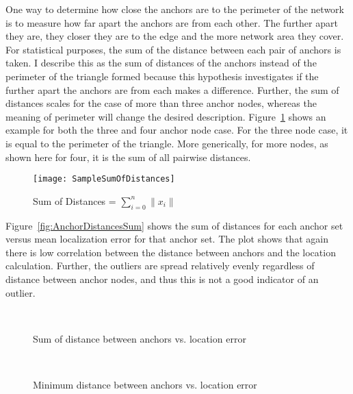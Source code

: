 One way to determine how close the anchors are to the perimeter of the network is to measure how far apart the anchors are from each other.  The further apart they are, they closer they are to the edge and the more network area they cover.  For statistical purposes, the sum of the distance between each pair of anchors is taken.  I describe this as the sum of distances of the anchors instead of the perimeter of the triangle formed because this hypothesis investigates if the further apart the anchors are from each makes a difference. Further, the sum of distances scales for the case of more than three anchor nodes, whereas the meaning of perimeter will change the desired description.  Figure~\ref{fig:SampleSumOfDistances} shows an example for both the three and four anchor node case.  For the three node case, it is equal to the perimeter of the triangle.  More generically, for more nodes, as shown here for four, it is the sum of all pairwise distances.

\begin{figure}
  \centering
    \texttt{[image: SampleSumOfDistances]}
    \caption{Sum of Distances = $\sum_{i=0}^{n} \|x_{i}\| $}
	\label{fig:SampleSumOfDistances}
\end{figure}

Figure~\ref{fig:AnchorDistancesSum} shows the sum of distances for each anchor set versus mean localization error for that anchor set. The plot shows that again there is low correlation between the distance between anchors and the location calculation.  Further, the outliers are spread relatively evenly regardless of distance between anchor nodes, and thus this is not a good indicator of an outlier.

\begin{figure}
  \centering
\\
	\caption{Sum of distance between anchors vs. location error}
    \label{fig:SumAnchorDistances}
\end{figure}
\begin{figure}
  \centering
\\
	\caption{Minimum distance between anchors vs. location error}
    \label{fig:MinAnchorDistances}
\end{figure}

